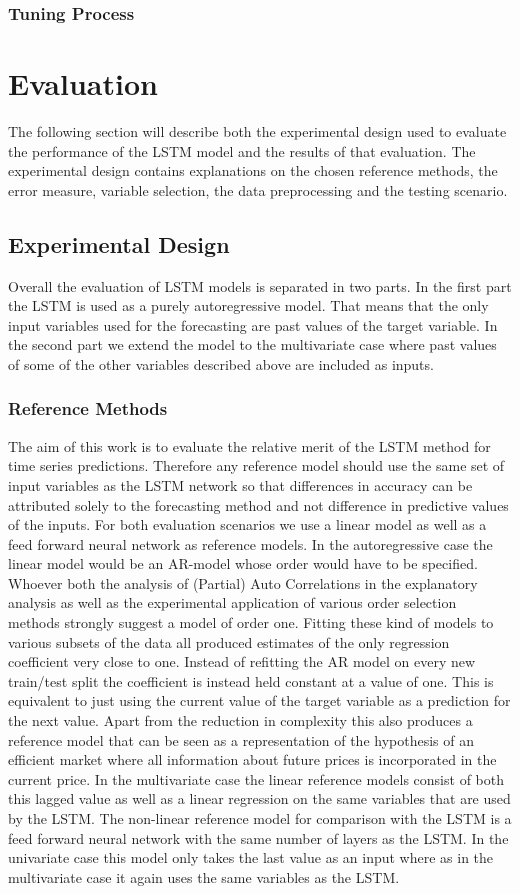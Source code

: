 \subsubsection{Tuning Process}
\section{Evaluation}\label{Sec:Results}
The following section will describe both the experimental design used to evaluate the performance of the LSTM model and the results of that evaluation. The experimental design contains explanations on the chosen reference methods, the error measure, variable selection, the data preprocessing and the testing scenario. 
\subsection{Experimental Design}
Overall the evaluation of LSTM models is separated in two parts. In the first part the LSTM is used as a purely autoregressive model. That means that the only input variables used for the forecasting are past values of the target variable. In the second part we extend the model to the multivariate case where past values of some of the other variables described above are included as inputs. 
\subsubsection{Reference Methods}
The aim of this work is to evaluate the relative merit of the LSTM method for time series predictions. Therefore  any reference model should use the same set of input variables as the LSTM network so that differences in accuracy can be attributed solely to the forecasting method and not difference in predictive values of the inputs.
For both evaluation scenarios we use a linear model as well as a feed forward neural network as reference models. In the autoregressive case the linear model would be an AR-model whose order would have to be specified. Whoever both the analysis of (Partial) Auto Correlations in the explanatory analysis as well as the experimental application of various order selection methods strongly suggest a model of order one. Fitting these kind of models to various subsets of the data all produced estimates of the only regression coefficient very close to one. Instead of refitting the AR model on every new train/test split the coefficient is instead held constant at a value of one. This is equivalent to just using the current value of the target variable as a prediction for the next value. Apart from the reduction in complexity this also produces a reference model that can be seen as a representation of the hypothesis of an efficient market where all information about future prices is incorporated in the current price. In the multivariate case the linear reference models consist of both this lagged value as well as a linear regression on the same variables that are used by the LSTM. The non-linear reference model for comparison with the LSTM is a feed forward neural network with the same number of layers as the LSTM. In the univariate case this model only takes the last value as an input where as in the multivariate case it again uses the same variables as the LSTM.
